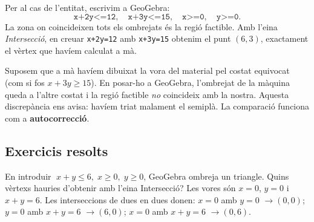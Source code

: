\begin{exemple}
Per al cas de l'entitat, escrivim a GeoGebra:
\[
\texttt{x+2y<=12}, \quad \texttt{x+3y<=15}, \quad \texttt{x>=0}, \quad \texttt{y>=0}.
\]
La zona on coincideixen tots els ombrejats és la regió factible. Amb l'eina
\emph{Intersecció}, en creuar \texttt{x+2y=12} amb \texttt{x+3y=15} obtenim el punt
$(6,3)$, exactament el vèrtex que havíem calculat a mà.

\begin{center}

\end{center}
\end{exemple}

\begin{exemple}
Suposem que a mà havíem dibuixat la vora del material pel costat equivocat (com si
fos $x+3y\ge 15$). En posar-ho a GeoGebra, l'ombrejat de la màquina queda a l'altre
costat i la regió factible \emph{no} coincideix amb la nostra. Aquesta discrepància
ens avisa: havíem triat malament el semiplà. La comparació funciona com a
\textbf{autocorrecció}.
\end{exemple}

\subsection{Exercicis resolts}

\begin{exresolt}
En introduir $\;x+y\le 6,\;x\ge 0,\;y\ge 0$, GeoGebra ombreja un triangle. Quins
vèrtexs hauries d'obtenir amb l'eina Intersecció?
\solucio
Les vores són $x=0$, $y=0$ i $x+y=6$. Les interseccions de dues en dues donen:
$x=0$ amb $y=0$ $\rightarrow (0,0)$; $y=0$ amb $x+y=6$ $\rightarrow (6,0)$; $x=0$ amb
$x+y=6$ $\rightarrow (0,6)$.
\end{exresolt}

